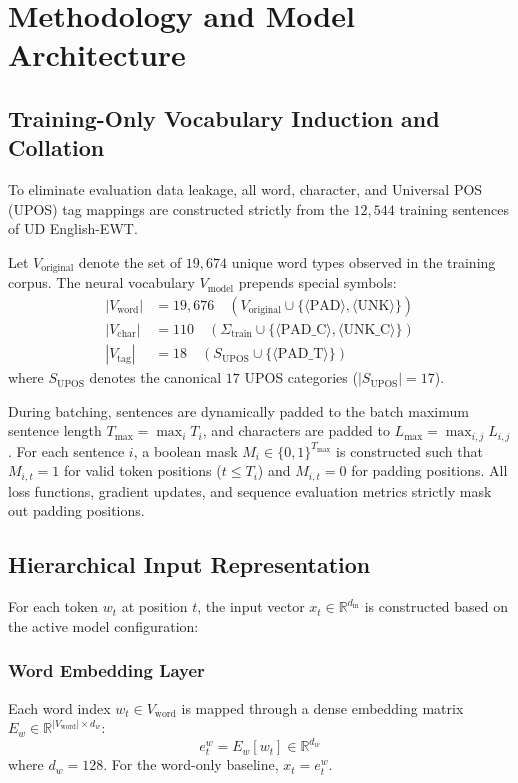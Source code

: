 \documentclass[conference]{IEEEtran}
\begin{document}
\section{Methodology and Model Architecture}
\label{sec:methodology}

\subsection{Training-Only Vocabulary Induction and Collation}
To eliminate evaluation data leakage, all word, character, and Universal POS (UPOS) tag mappings are constructed strictly from the $12,544$ training sentences of UD English-EWT. 

Let $V_{\text{original}}$ denote the set of $19,674$ unique word types observed in the training corpus. The neural vocabulary $V_{\text{model}}$ prepends special symbols:
\begin{align}
|V_{\text{word}}| &= 19,676 \quad (V_{\text{original}} \cup \{\langle\text{PAD}\rangle, \langle\text{UNK}\rangle\}) \\
|V_{\text{char}}| &= 110 \quad (\Sigma_{\text{train}} \cup \{\langle\text{PAD\_C}\rangle, \langle\text{UNK\_C}\rangle\}) \\
|V_{\text{tag}}|  &= 18 \quad (S_{\text{UPOS}} \cup \{\langle\text{PAD\_T}\rangle\})
\end{align}
where $S_{\text{UPOS}}$ denotes the canonical $17$ UPOS categories ($|S_{\text{UPOS}}| = 17$).

During batching, sentences are dynamically padded to the batch maximum sentence length $T_{\max} = \max_{i} T_i$, and characters are padded to $L_{\max} = \max_{i, j} L_{i, j}$. For each sentence $i$, a boolean mask $M_i \in \{0, 1\}^{T_{\max}}$ is constructed such that $M_{i, t} = 1$ for valid token positions ($t \le T_i$) and $M_{i, t} = 0$ for padding positions. All loss functions, gradient updates, and sequence evaluation metrics strictly mask out padding positions.

\subsection{Hierarchical Input Representation}
For each token $w_t$ at position $t$, the input vector $x_t \in \mathbb{R}^{d_{\text{in}}}$ is constructed based on the active model configuration:

\subsubsection{Word Embedding Layer}
Each word index $w_t \in V_{\text{word}}$ is mapped through a dense embedding matrix $E_w \in \mathbb{R}^{|V_{\text{word}}| \times d_w}$:
\begin{equation}
e_t^w = E_w[w_t] \in \mathbb{R}^{d_w}
\end{equation}
where $d_w = 128$. For the word-only baseline, $x_t = e_t^w$.
\end{document}
